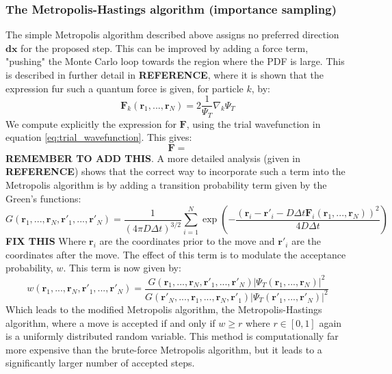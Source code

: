 \documentclass[a4paper, 10pt]{article}
\begin{document}
\subsubsection{The Metropolis-Hastings algorithm (importance sampling)}
The simple Metropolis algorithm described above assigns no preferred direction $\boldsymbol{dx}$ for the proposed step. This can be improved by adding a force term, "pushing" the Monte Carlo loop towards the region where the PDF is large. This is described in further detail in \textbf{REFERENCE}, where it is shown that the expression fur such a quantum force is given, for particle $k$, by:
\begin{equation}
\boldsymbol{F}_k(\boldsymbol{r}_1, ..., \boldsymbol{r}_N)=2\frac{1}{\Psi_T}\nabla_k \Psi_T
\end{equation}
We compute explicitly the expression for $\boldsymbol{F}$, using the trial wavefunction in equation \ref{eq:trial_wavefunction}. This gives:
\begin{equation}
\boldsymbol{F}=
\end{equation}
\textbf{REMEMBER TO ADD THIS}. A more detailed analysis (given in \textbf{REFERENCE}) shows that the correct way to incorporate such a term into the Metropolis algorithm is by adding a transition probability term given by the Green's functions:
\begin{equation}
G(\boldsymbol{r}_1,...,\boldsymbol{r}_N,\boldsymbol{r'}_1,...,\boldsymbol{r'}_N)=\frac{1}{(4\pi D \Delta t)^{3/2}}\sum_{i=1}^N \exp \left(-\frac{(\boldsymbol{r}_i-\boldsymbol{r'}_i-D\Delta t\boldsymbol{F}_i(\boldsymbol{r}_1,...,\boldsymbol{r}_N))^2}{4D\Delta t}\right)
\end{equation}
\textbf{FIX THIS} Where $\boldsymbol{r}_i$ are the coordinates prior to the move and $\boldsymbol{r'}_i$ are the coordinates after the move. The effect of this term is to modulate the acceptance probability, $w$. This term is now given by:
\begin{equation}
w(\boldsymbol{r}_1,...,\boldsymbol{r}_N,\boldsymbol{r'}_1,...,\boldsymbol{r'}_N)=\frac{G(\boldsymbol{r}_1,...,\boldsymbol{r}_N,\boldsymbol{r'}_1,...,\boldsymbol{r'}_N)|\Psi_T(\boldsymbol{r}_1,...,\boldsymbol{r}_N)|^2}{G(\boldsymbol{r'}_N,...,\boldsymbol{r}_1,...,\boldsymbol{r}_N,\boldsymbol{r'}_1)|\Psi_T(\boldsymbol{r'}_1,...,\boldsymbol{r'}_N)|^2}
\end{equation}
Which leads to the modified Metropolis algorithm, the Metropolis-Hastings algorithm, where a move is accepted if and only if $w\geq r$ where $r\in [0,1]$ again is a uniformly distributed random variable. This method is computationally far more expensive than the brute-force Metropolis algorithm, but it leads to a  significantly larger number of accepted steps.
\end{document}
